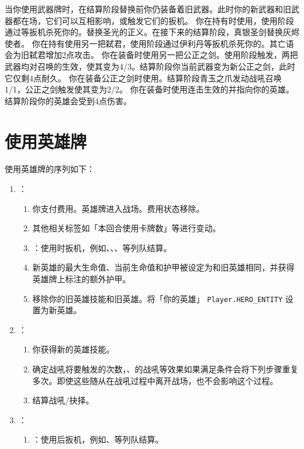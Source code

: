 当你使用武器牌时，在结算阶段替换前你仍装备着旧武器。此时你的新武器和旧武器都在场，它们可以互相影响，或触发它们的扳机。
\example 你在持有时使用，使用阶段通过等扳机杀死你的。替换圣光的正义。在接下来的结算阶段，真银圣剑替换灰烬使者。
\example 你在持有使用另一把弑君，使用阶段通过伊利丹等扳机杀死你的。其亡语会为旧弑君增加2点攻击。
\example 你在装备时使用另一把公正之剑。使用阶段触发，两把武器均对召唤的生效，使其变为4/3。结算阶段你当前武器变为新公正之剑，此时它仅剩4点耐久。
\example 你在装备公正之剑时使用。结算阶段青玉之爪发动战吼召唤1/1，公正之剑触发使其变为2/2。
\example 你在装备时使用连击生效的并指向你的英雄。结算阶段你的英雄会受到4点伤害。
​
\section{使用英雄牌}

使用英雄牌的序列如下：

\begin{enumerate}
    \item {}：
    \begin{enumerate}
        \item 你支付费用。英雄牌进入战场。费用状态移除。
        \item 其他相关标签如「本回合使用卡牌数」等进行变动。
        \item {}：使用时扳机，例如、、、等列队结算。
        \item 新英雄的最大生命值、当前生命值和护甲被设定为和旧英雄相同，并获得英雄牌上标注的额外护甲。
        \item 移除你的旧英雄技能和旧英雄。将「你的英雄」 \texttt{Player.HERO\_ENTITY} 设置为新英雄。
    \end{enumerate}

    \item {}：
    \begin{enumerate}
        \item 你获得新的英雄技能。
        \item 确定战吼将要触发的次数，、的战吼等效果如果满足条件会将下列步骤重复多次。即使这些随从在战吼过程中离开战场，也不会影响这个过程。
        \item 结算战吼/抉择。
    \end{enumerate}

    \item {}：
    \begin{enumerate}
        \item {}：使用后扳机，例如、等列队结算。
    \end{enumerate}
\end{enumerate}

